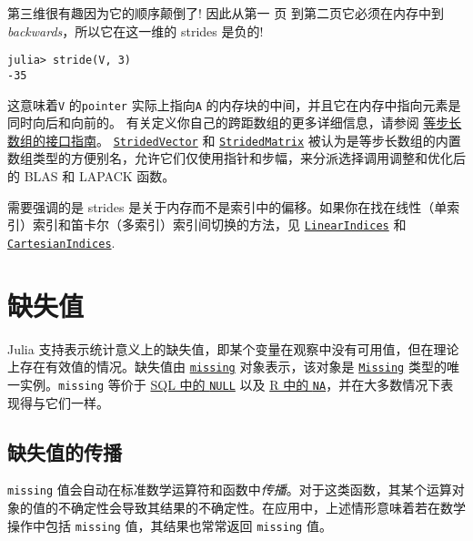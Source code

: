 第三维很有趣因为它的顺序颠倒了! 因此从第一 {\textquotedbl}页{\textquotedbl} 到第二页它必须在内存中到 \emph{backwards}，所以它在这一维的 strides 是负的!




\begin{verbatim}
julia> stride(V, 3)
-35
\end{verbatim}



这意味着\texttt{V} 的\texttt{pointer} 实际上指向\texttt{A} 的内存块的中间，并且它在内存中指向元素是同时向后和向前的。 有关定义你自己的跨距数组的更多详细信息，请参阅 \hyperlink{3010450308855105276}{等步长数组的接口指南}。 \hyperlink{18350706206094827862}{\texttt{StridedVector}} 和 \hyperlink{3855703768476610836}{\texttt{StridedMatrix}} 被认为是等步长数组的内置数组类型的方便别名，允许它们仅使用指针和步幅，来分派选择调用调整和优化后的 BLAS 和 LAPACK 函数。



需要强调的是 strides 是关于内存而不是索引中的偏移。如果你在找在线性（单索引）索引和笛卡尔（多索引）索引间切换的方法，见 \hyperlink{12250457823889413092}{\texttt{LinearIndices}} 和 \hyperlink{16831958174907250244}{\texttt{CartesianIndices}}.



\hypertarget{16922701023279192482}{}


\chapter{缺失值}



Julia 支持表示统计意义上的缺失值，即某个变量在观察中没有可用值，但在理论上存在有效值的情况。缺失值由 \hyperlink{14596725676261444434}{\texttt{missing}} 对象表示，该对象是 \hyperlink{9306488559141158579}{\texttt{Missing}} 类型的唯一实例。\texttt{missing} 等价于 \href{https://en.wikipedia.org/wiki/NULL\_(SQL)}{SQL 中的 \texttt{NULL}} 以及 \href{https://cran.r-project.org/doc/manuals/r-release/R-lang.html\#NA-handling}{R 中的 \texttt{NA}}，并在大多数情况下表现得与它们一样。



\hypertarget{16983381017967078050}{}


\section{缺失值的传播}



\texttt{missing}  值会自动在标准数学运算符和函数中\emph{传播}。对于这类函数，其某个运算对象的值的不确定性会导致其结果的不确定性。在应用中，上述情形意味着若在数学操作中包括 \texttt{missing}  值，其结果也常常返回 \texttt{missing} 值。




